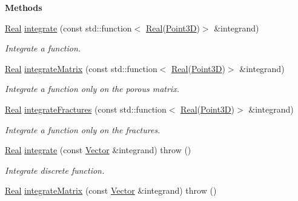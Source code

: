 \begin{Indent}{\bf Methods}\par
\begin{DoxyCompactItemize}
\item 
\hyperlink{namespaceFVCode3D_a40c1f5588a248569d80aa5f867080e83}{Real} \hyperlink{classFVCode3D_1_1Quadrature_a6fc230221b791290d8f410fb8ebd3133}{integrate} (const std\+::function$<$ \hyperlink{namespaceFVCode3D_a40c1f5588a248569d80aa5f867080e83}{Real}(\hyperlink{classFVCode3D_1_1Point3D}{Point3D})$>$ \&integrand)
\begin{DoxyCompactList}\small\item\em Integrate a function. \end{DoxyCompactList}\item 
\hyperlink{namespaceFVCode3D_a40c1f5588a248569d80aa5f867080e83}{Real} \hyperlink{classFVCode3D_1_1Quadrature_a1b9bd586f125dcda6d4aaebcdda83b80}{integrate\+Matrix} (const std\+::function$<$ \hyperlink{namespaceFVCode3D_a40c1f5588a248569d80aa5f867080e83}{Real}(\hyperlink{classFVCode3D_1_1Point3D}{Point3D})$>$ \&integrand)
\begin{DoxyCompactList}\small\item\em Integrate a function only on the porous matrix. \end{DoxyCompactList}\item 
\hyperlink{namespaceFVCode3D_a40c1f5588a248569d80aa5f867080e83}{Real} \hyperlink{classFVCode3D_1_1Quadrature_a18e580bc530cfc004154b0e48a8617e7}{integrate\+Fractures} (const std\+::function$<$ \hyperlink{namespaceFVCode3D_a40c1f5588a248569d80aa5f867080e83}{Real}(\hyperlink{classFVCode3D_1_1Point3D}{Point3D})$>$ \&integrand)
\begin{DoxyCompactList}\small\item\em Integrate a function only on the fractures. \end{DoxyCompactList}\item 
\hyperlink{namespaceFVCode3D_a40c1f5588a248569d80aa5f867080e83}{Real} \hyperlink{classFVCode3D_1_1Quadrature_a6dfe290f1aa58ad93939df3180366cbc}{integrate} (const \hyperlink{namespaceFVCode3D_a16ccf345652402bccd1a5d2e6782526c}{Vector} \&integrand)  throw ()
\begin{DoxyCompactList}\small\item\em Integrate discrete function. \end{DoxyCompactList}\item 
\hyperlink{namespaceFVCode3D_a40c1f5588a248569d80aa5f867080e83}{Real} \hyperlink{classFVCode3D_1_1Quadrature_a2dc75b0980ba9e7edb74c5d8752b15b0}{integrate\+Matrix} (const \hyperlink{namespaceFVCode3D_a16ccf345652402bccd1a5d2e6782526c}{Vector} \&integrand)  throw ()

\end{DoxyCompactItemize}
\end{Indent}
